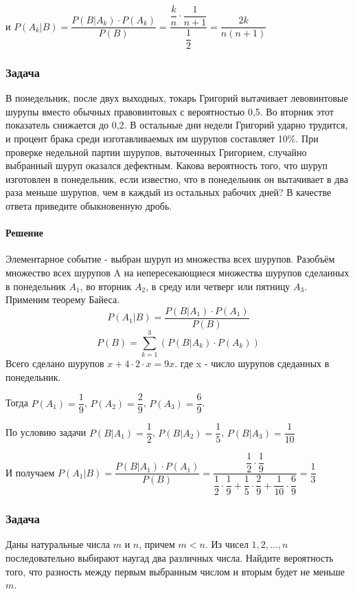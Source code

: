 \documentclass[a4paper,12pt]{article}
\begin{document}
и \(  P(A_k|B) = \dfrac{P(B|A_k) \cdot P(A_k) }{P(B)} = \dfrac{\dfrac{k}{n} \cdot \dfrac{1}{n+1}}{\dfrac{1}{2}} = \dfrac{2k}{n(n+1)}  \)

\subsubsection*{Задача}
В понедельник, после двух выходных, токарь Григорий вытачивает левовинтовые шурупы вместо обычных правовинтовых с вероятностью 0,5. Во вторник этот показатель снижается до 0,2. В остальные дни недели Григорий ударно трудится, и процент брака среди изготавливаемых им шурупов составляет 10\%. При проверке недельной партии шурупов, выточенных Григорием, случайно выбранный шуруп оказался дефектным. Какова вероятность того, что шуруп изготовлен в понедельник, если известно, что в понедельник он вытачивает в два раза меньше шурупов, чем в каждый из остальных рабочих дней? В качестве ответа приведите обыкновенную дробь.
\paragraph{Решение}
Элементарное событие - выбран шуруп из множества всех шурупов. Разобъём множество всех шурупов A на непересекающиеся множества шурупов сделанных в понедельник \(A_1\), во вторник \(A_2\), в среду или четверг или пятницу \(A_3\). Применим теорему Байеса.
\[ P(A_1|B) = \dfrac{P(B|A_1) \cdot P(A_1) }{P(B)} \]
\[ P(B) = \sum_{k=1}^{3} \left(P(B|A_k) \cdot P(A_k)\right) \]
Всего сделано шурупов \( x + 4 \cdot 2 \cdot x  = 9x\). где x - число шурупов сдеданных в понедельник.

Тогда \( P(A_1) = \dfrac{1}{9} \),
\( P(A_2) = \dfrac{2}{9} \),
\( P(A_3) = \dfrac{6}{9} \).

По условию задачи \( P(B|A_1) = \dfrac{1}{2} \), 
\( P(B|A_2) = \dfrac{1}{5} \), \( P(B|A_3) = \dfrac{1}{10} \) 

И получаем \( P(A_1|B) = \dfrac{P(B|A_1) \cdot P(A_1) }{P(B)} = \dfrac{\dfrac{1}{2} \cdot \dfrac{1}{9}}{\dfrac{1}{2} \cdot \dfrac{1}{9} + \dfrac{1}{5} \cdot \dfrac{2}{9} + \dfrac{1}{10} \cdot \dfrac{6}{9}} = \dfrac{1}{3} \)


\subsubsection*{Задача}
Даны натуральные числа \(m\) и \(n\), причем \(m<n\). Из чисел \(1,2,…,n\) последовательно выбирают наугад
два различных числа. Найдите вероятность того, что разность между первым выбранным числом и вторым будет не меньше \(m\).
\end{document}
